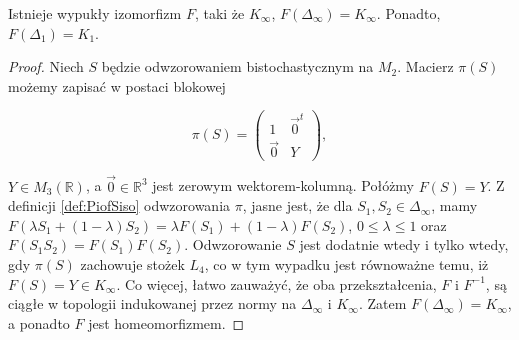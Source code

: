 {\begin{Theorem}
\label{thm:Ball}
Istnieje wypukły izomorfizm $F$, taki że $K_{\infty}$, $F(\Delta_{\infty}) = K_{\infty}$.
Ponadto, $F(\Delta_{1}) = K_{1}$.
\end{Theorem}
\begin{proof}
Niech $S$ będzie odwzorowaniem bistochastycznym na $M_{2}$.
Macierz $\pi(S)$ możemy zapisać w postaci blokowej
\begin{linenomath*}
 \begin{equation}
\label{eq:Sbistochastic}
\pi(S) = \begin{pmatrix}
    1  &  \vec{0}^{t} \\
    \vec{0} & Y
    \end{pmatrix},
 \end{equation}
\end{linenomath*}
$Y \in M_{3}(\mathbb{R})$,
a $\vec{0} \in \mathbb{R}^{3}$ jest zerowym wektorem-kolumną.
Połóżmy $F(S) = Y$.
Z definicji \eqref{def:PiofSiso}
odwzorowania $\pi$,
jasne jest, że dla  $S_{1}, S_{2} \in \Delta_{\infty}$,
mamy $F \left( \lambda S_{1} + (1-\lambda) S_{2} \right) =
 \lambda F(S_{1}) + (1-\lambda) F(S_{2})$,
$0 \leq \lambda \leq 1$
oraz $F(S_{1} S_{2}) = F(S_{1}) F(S_{2})$.
Odwzorowanie $S$ jest dodatnie wtedy i tylko wtedy, gdy
$\pi(S)$ zachowuje stożek $L_{4}$,
co w tym wypadku jest równoważne temu, iż $F(S) = Y \in K_{\infty}$.
Co więcej, łatwo zauważyć, że oba przekształcenia, $F$ i $F^{-1}$,
są ciągłe w topologii indukowanej przez normy na
$\Delta_{\infty}$ i $K_{\infty}$.
Zatem $F(\Delta_{\infty}) = K_{\infty}$, a ponadto $F$ jest homeomorfizmem.


\end{proof}}
